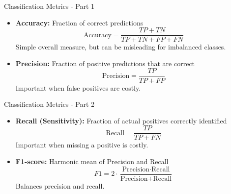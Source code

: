 \documentclass{beamer}
\begin{document}
\begin{frame}{Classification Metrics - Part 1}

\begin{itemize}
    \item \textbf{Accuracy:} Fraction of correct predictions
    \[
    \text{Accuracy} = \frac{TP + TN}{TP + TN + FP + FN}
    \]
    Simple overall measure, but can be misleading for imbalanced classes.
    
    \item \textbf{Precision:} Fraction of positive predictions that are correct
    \[
    \text{Precision} = \frac{TP}{TP + FP}
    \]
    Important when false positives are costly.
\end{itemize}

\end{frame}

\begin{frame}{Classification Metrics - Part 2}

\begin{itemize}
    \item \textbf{Recall (Sensitivity):} Fraction of actual positives correctly identified
    \[
    \text{Recall} = \frac{TP}{TP + FN}
    \]
    Important when missing a positive is costly.
    
    \item \textbf{F1-score:} Harmonic mean of Precision and Recall
    \[
    F1 = 2 \cdot \frac{\text{Precision} \cdot \text{Recall}}{\text{Precision} + \text{Recall}}
    \]
    Balances precision and recall.
\end{itemize}

\end{frame}
\end{document}
